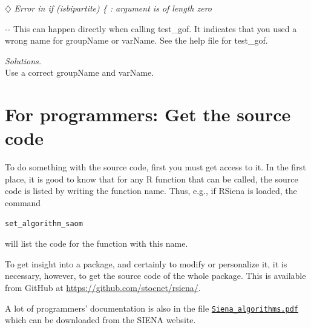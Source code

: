 \documentclass[a4paper,fleqn,11pt]{article}
\makeatletter
\newcommand{\+}{\, + \,}
\newcommand{\sfn}[1]{\textsf{#1}}
\newcommand{\R}{{\sf R }}
\newcommand{\RS}{{\sf \textsf{RSiena} }}
\newcommand{\SI}{{\sf SIENA }}
\newenvironment{indentation}[2]
{\par \setlength{\leftmargin}{#1}       \setlength{\rightmargin}{#2}
  \advance\linewidth -\leftmargin       \advance\linewidth -\rightmargin
  \advance\@totalleftmargin\leftmargin  \@setpar{{\@@par}}%
  \parshape 1 \@totalleftmargin         \linewidth \ignorespaces}{\par}
\makeatother
\begin{document}
\noindent
$\diamondsuit$
\emph{Error in if (isbipartite) \{ : argument is of length zero }
\smallskip

\begin{indentation}{0.04\textwidth}{0pt}
\noindent
This can happen directly when calling \textsf{test\_gof}.
It indicates that you used a wrong name for \sfn{groupName} or \sfn{varName}.
See the help file for \textsf{test\_gof}.
\smallskip

\noindent
\emph{Solutions.} \\
Use a correct \sfn{groupName} and \sfn{varName}.
\end{indentation}

\newpage

\section{For programmers: Get the source code}

To do something with the source code,
first you must get access to it.
In the first place, it is good to know that for any \R function
that can be called,
the source code is listed by writing the function name.
Thus, e.g., if \RS is loaded, the command
\begin{verbatim}
set_algorithm_saom
\end{verbatim}
will list the code for the function with this name.

To get insight into a package, and certainly to modify
or personalize it, it is necessary, however,
to get the source code of the whole package.
This is available from GitHub at
\url{https://github.com/stocnet/rsiena/}.

A lot of programmers' documentation is also in the file
\href{http://www.stats.ox.ac.uk/~snijders/siena/Siena_algorithms.pdf}{\texttt{Siena\_algorithms.pdf}}
which can be downloaded from the
\SI website.
\end{document}
